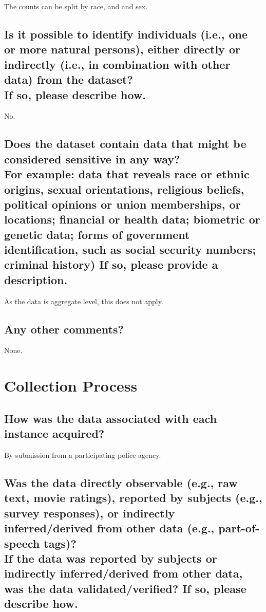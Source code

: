 \documentclass[letterpaper, 10 pt, conference]{ieeeconf}  %
\newcommand{\subtitle}[1]{{\\ \small \normalfont \color{purple} #1}}
\begin{document}
The counts can be split by race, and and sex.

\subsection{Is it possible to identify individuals (i.e., one or more natural persons), either directly or indirectly (i.e., in combination with other data) from the dataset? \subtitle{If so, please describe how.}}

No.

\subsection{Does the dataset contain data that might be considered sensitive in any way? \subtitle{For example: data that reveals race or ethnic origins, sexual orientations, religious beliefs, political opinions or union memberships, or locations; financial or health data; biometric or genetic data; forms of government identification, such as social security numbers; criminal history) If so, please provide a description.}}

As the data is aggregate level, this does not apply.

\subsection{Any other comments?}

None.

\section{Collection Process}

\subsection{How was the data associated with each instance acquired?}

By submission from a participating police agency.

\subsection{Was the data directly observable (e.g., raw text, movie ratings), reported by subjects (e.g., survey responses), or indirectly inferred/derived from other data (e.g., part-of-speech tags)? \subtitle{If the data was reported by subjects or indirectly inferred/derived from other data, was the data validated/verified? If so, please describe how.}}
\end{document}
